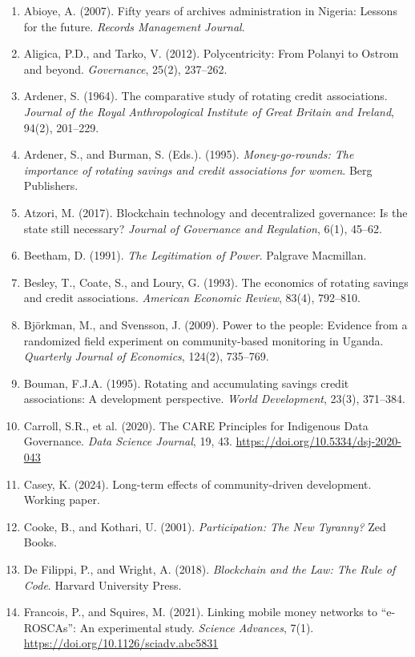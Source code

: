 \documentclass[sigconf,anonymous]{acmart}
\begin{document}
{\small
\begin{enumerate}
\item Abioye, A. (2007). Fifty years of archives administration in Nigeria: Lessons for the future. \textit{Records Management Journal}.
\item Aligica, P.D., and Tarko, V. (2012). Polycentricity: From Polanyi to Ostrom and beyond. \textit{Governance}, 25(2), 237--262.
\item Ardener, S. (1964). The comparative study of rotating credit associations. \textit{Journal of the Royal Anthropological Institute of Great Britain and Ireland}, 94(2), 201--229.
\item Ardener, S., and Burman, S. (Eds.). (1995). \textit{Money-go-rounds: The importance of rotating savings and credit associations for women}. Berg Publishers.
\item Atzori, M. (2017). Blockchain technology and decentralized governance: Is the state still necessary? \textit{Journal of Governance and Regulation}, 6(1), 45--62.
\item Beetham, D. (1991). \textit{The Legitimation of Power}. Palgrave Macmillan.
\item Besley, T., Coate, S., and Loury, G. (1993). The economics of rotating savings and credit associations. \textit{American Economic Review}, 83(4), 792--810.
\item Björkman, M., and Svensson, J. (2009). Power to the people: Evidence from a randomized field experiment on community-based monitoring in Uganda. \textit{Quarterly Journal of Economics}, 124(2), 735--769.
\item Bouman, F.J.A. (1995). Rotating and accumulating savings credit associations: A development perspective. \textit{World Development}, 23(3), 371--384.
\item Carroll, S.R., et al. (2020). The CARE Principles for Indigenous Data Governance. \textit{Data Science Journal}, 19, 43. \url{https://doi.org/10.5334/dsj-2020-043}
\item Casey, K. (2024). Long-term effects of community-driven development. Working paper.
\item Cooke, B., and Kothari, U. (2001). \textit{Participation: The New Tyranny?} Zed Books.
\item De Filippi, P., and Wright, A. (2018). \textit{Blockchain and the Law: The Rule of Code}. Harvard University Press.
\item Francois, P., and Squires, M. (2021). Linking mobile money networks to ``e-ROSCAs'': An experimental study. \textit{Science Advances}, 7(1). \url{https://doi.org/10.1126/sciadv.abc5831}

\end{enumerate}}
\end{document}
